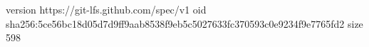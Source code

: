 version https://git-lfs.github.com/spec/v1
oid sha256:5ce56bc18d05d7d9ff9aab8538f9eb5c5027633fc370593c0e9234f9e7765fd2
size 598
